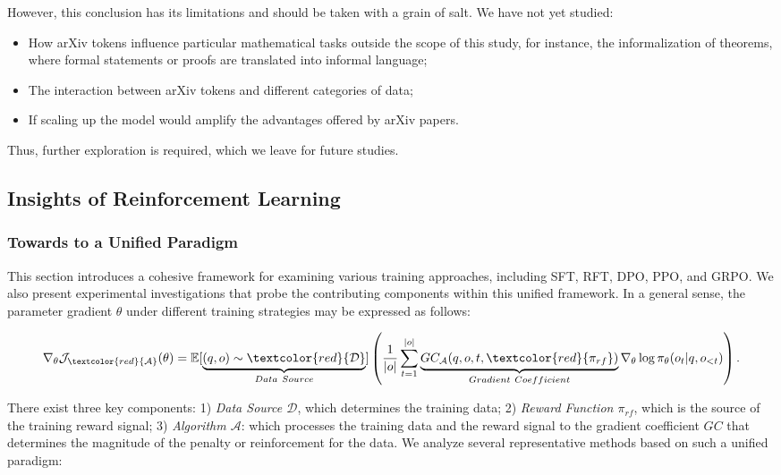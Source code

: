 \begin{itemize}[topsep=0pt]
\begin{itemize}[topsep=0pt]
However, this conclusion has its limitations and should be taken with a grain of salt. We have not yet studied:

\begin{itemize}[topsep=0pt]
    \item How arXiv tokens influence particular mathematical tasks outside the scope of this study, for instance, the informalization of theorems, where formal statements or proofs are translated into informal language;
    \item The interaction between arXiv tokens and different categories of data;
    \item If scaling up the model would amplify the advantages offered by arXiv papers.
\end{itemize}

Thus, further exploration is required, which we leave for future studies.

\subsection{Insights of Reinforcement Learning}
\subsubsection{Towards to a Unified Paradigm} This section introduces a cohesive framework for examining various training approaches, including SFT, RFT, DPO, PPO, and GRPO. We also present experimental investigations that probe the contributing components within this unified framework. In a general sense, the parameter gradient $\theta$ under different training strategies may be expressed as follows:

\begin{equation}
    \nabla_{\theta}\mathcal{J}_{\textcolor{red}{\mathcal{A}}}(\theta) = \mathbb{E}[\underbrace{(q,o) \sim \textcolor{red}{\mathcal{D}}}_{Data \ Source}]\left( \frac{1}{|o|} \sum_{t=1}^{|o|}  \underbrace{GC_{{\mathcal{A}}}(q, o, t, \textcolor{red}{\pi_{{rf}}})}_{Gradient \ Coefficient}  \nabla_{\theta}\log \pi_{\theta}(o_t | q, o_{<t})\right).
\label{eq:objective}
\end{equation}

There exist three key components: 1) \textit{Data Source $\mathcal{D}$}, which determines the training data; 2) \textit{Reward Function $\pi_{{rf}}$}, which is the source of the training reward signal; 3) \textit{Algorithm $\mathcal{A}$}: which processes the training data and the reward signal to the gradient coefficient $GC$ that determines the magnitude of the penalty or reinforcement for the data. We analyze several representative methods based on such a unified paradigm:


\end{itemize}
\end{itemize}
